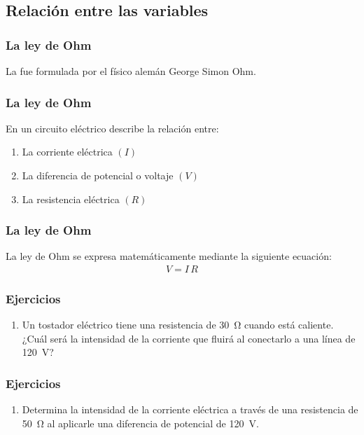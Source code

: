 \documentclass[14pt]{beamer}
\begin{document}
\subsection{Relación entre las variables}

\begin{frame}
\frametitle{La ley de Ohm}
La  fue formulada por el físico alemán George Simon Ohm.
\end{frame}
\begin{frame}
\frametitle{La ley de Ohm}
En un circuito eléctrico describe la relación entre:
\pause
{}
\begin{enumerate}[<+->]
\item La corriente eléctrica $(I)$
\item La diferencia de potencial o voltaje $(V)$
\item La resistencia eléctrica $(R)$
\end{enumerate}
\end{frame}
\begin{frame}
\frametitle{La ley de Ohm}
La ley de Ohm se expresa matemáticamente mediante la siguiente ecuación:
\pause
\begin{align*}
V = I \, R
\end{align*}
\end{frame}
\begin{frame}
\frametitle{Ejercicios}
\begin{enumerate}[<+->]
\item Un tostador eléctrico tiene una resistencia de \SI{30}{\ohm} cuando está caliente. ¿Cuál será la intensidad de la corriente que fluirá al conectarlo a una línea de \SI{120}{\volt}?
\seti
\end{enumerate}
\end{frame}
\begin{frame}
\frametitle{Ejercicios}
\begin{enumerate}[<+->]
\conti
\item Determina la intensidad de la corriente eléctrica a través de una resistencia de \SI{50}{\ohm} al aplicarle una diferencia de potencial de \SI{120}{\volt}.
\seti
\end{enumerate}
\end{frame}
\end{document}
